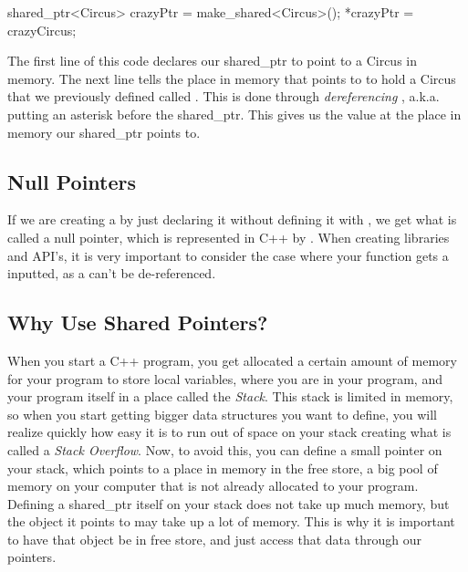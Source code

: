\documentclass{tufte-handout}
\begin{document}
\begin{Code}
shared_ptr<Circus> crazyPtr = make_shared<Circus>();
*crazyPtr = crazyCircus;
\end{Code}

\noindent
The first line of this code declares our shared\_ptr to point to a Circus in memory. 
The next line tells the place in memory that   points to to hold a Circus that we previously defined called .  
This is done through \textit{dereferencing} , a.k.a. putting an asterisk before the shared\_ptr.  
This gives us the value at the place in memory our shared\_ptr points to.

\subsection{Null Pointers}

If we are creating a  by just declaring it without defining it with , we get what is called a null pointer, which is represented in C++ by .
When creating libraries and API's, it is very important to consider the case where your function gets a  inputted, as a  can't be de-referenced.

\subsection{Why Use Shared Pointers?}
When you start a C++ program, you get allocated a certain amount of memory for your program to store local variables, where you are in your program, and your program itself in a place called the \textit{Stack}.
This stack is limited in memory, so when you start getting bigger data structures you want to define, you will realize quickly how easy it is to run out of space on your stack creating what is called a \textit{Stack Overflow}.
Now, to avoid this, you can define a small pointer on your stack, which points to a place in memory in the free store, a big pool of memory on your computer that is not already allocated to your program.
Defining a shared\_ptr itself on your stack does not take up much memory, but the object it points to may take up a lot of memory.  
This is why it is important to have that object be in free store, and just access that data through our pointers.
\end{document}
